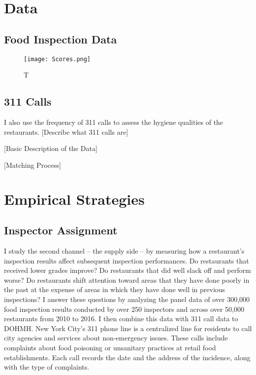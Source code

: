 \documentclass[12pt]{article}
\begin{document}
\section{Data}

\subsection{Food Inspection Data}

\begin{figure}[h]
\centering
\texttt{[image: Scores.png]}
\caption{T}
\end{figure}
\subsection{311 Calls}

I also use the frequency of 311 calls to assess the hygiene qualities of the restaurants. [Describe what 311 calls are]

[Basic Description of the Data]

[Matching Process]

\section{Empirical Strategies}

\subsection*{Inspector Assignment}


I study the second channel -- the supply side -- by measuring how a restaurant's inspection results affect subsequent inspection performances. Do restaurants that received lower grades improve? Do restaurants that did well slack off and perform worse? Do restaurants shift attention toward areas that they have done poorly in the past at the expense of areas in which they have done well in previous inspections? I answer these questions by analyzing the panel data of over 300,000 food inspection results conducted by over 250 inspectors and across over 50,000 restaurants from 2010 to 2016. I then combine this data with 311 call data to DOHMH. New York City's 311 phone line is a centralized line for residents to call city agencies and services about non-emergency issues. These calls include complaints about food poisoning or unsanitary practices at retail food establishments. Each call records the date and the address of the incidence, along with the type of complaints. 
\end{document}
